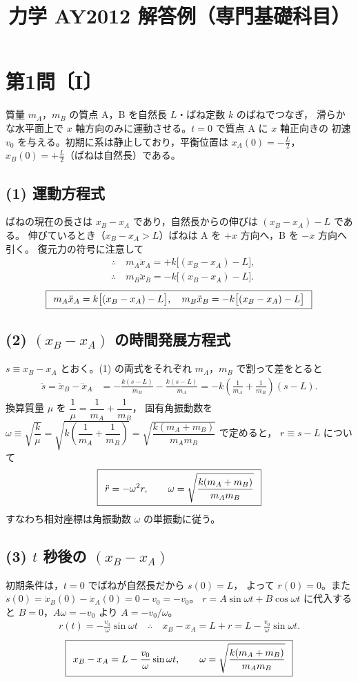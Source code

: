 \documentclass[11pt,a4paper]{article}
\title{力学 AY2012 解答例（専門基礎科目）}
\author{}
\date{}
\begin{document}
\maketitle

\section*{第1問〔I〕}

質量 $m_A$，$m_B$ の質点 A，B を自然長 $L$・ばね定数 $k$ のばねでつなぎ，
滑らかな水平面上で $x$ 軸方向のみに運動させる。$t=0$ で質点 A に $x$ 軸正向きの
初速 $v_0$ を与える。初期に系は静止しており，平衡位置は
$x_A(0)=-\tfrac{L}{2}$，$x_B(0)=+\tfrac{L}{2}$（ばねは自然長）である。

\subsection*{(1) 運動方程式}
ばねの現在の長さは $x_B-x_A$ であり，自然長からの伸びは $(x_B-x_A)-L$ である。
伸びているとき（$x_B-x_A>L$）ばねは A を $+x$ 方向へ，B を $-x$ 方向へ引く。
復元力の符号に注意して
\begin{align*}
  &\therefore\quad m_A\ddot{x}_A = +k\bigl[(x_B-x_A)-L\bigr],\\
  &\therefore\quad m_B\ddot{x}_B = -k\bigl[(x_B-x_A)-L\bigr].
\end{align*}
\[
  \boxed{\,\;
    m_A\ddot{x}_A = k\bigl[(x_B-x_A)-L\bigr],\quad
    m_B\ddot{x}_B = -k\bigl[(x_B-x_A)-L\bigr]\;\,}
\]

\subsection*{(2) $(x_B-x_A)$ の時間発展方程式}
$s\equiv x_B-x_A$ とおく。(1) の両式をそれぞれ $m_A$，$m_B$ で割って差をとると
\begin{align*}
  \ddot{s}=\ddot{x}_B-\ddot{x}_A
  &= -\frac{k(s-L)}{m_B}-\frac{k(s-L)}{m_A}
   = -k\!\left(\frac{1}{m_A}+\frac{1}{m_B}\right)(s-L).
\end{align*}
換算質量 $\mu$ を $\dfrac{1}{\mu}=\dfrac{1}{m_A}+\dfrac{1}{m_B}$，
固有角振動数を $\omega\equiv\sqrt{\dfrac{k}{\mu}}
=\sqrt{k\!\left(\dfrac{1}{m_A}+\dfrac{1}{m_B}\right)}
=\sqrt{\dfrac{k(m_A+m_B)}{m_A m_B}}$ で定めると，
$r\equiv s-L$ について
\[
  \boxed{\,\;\ddot{r}=-\omega^2 r,\qquad
  \omega=\sqrt{\dfrac{k(m_A+m_B)}{m_A m_B}}\;\,}
\]
すなわち相対座標は角振動数 $\omega$ の単振動に従う。

\subsection*{(3) $t$ 秒後の $(x_B-x_A)$}
初期条件は，$t=0$ でばねが自然長だから $s(0)=L$，
よって $r(0)=0$。また $\dot{s}(0)=\dot{x}_B(0)-\dot{x}_A(0)=0-v_0=-v_0$。
$r=A\sin\omega t+B\cos\omega t$ に代入すると $B=0$，$A\omega=-v_0$ より $A=-v_0/\omega$。
\begin{align*}
  r(t)=-\frac{v_0}{\omega}\sin\omega t
  \quad\therefore\quad
  x_B-x_A = L+r = L-\frac{v_0}{\omega}\sin\omega t.
\end{align*}
\[
  \boxed{\,\;x_B-x_A = L-\dfrac{v_0}{\omega}\sin\omega t,\qquad
  \omega=\sqrt{\dfrac{k(m_A+m_B)}{m_A m_B}}\;\,}
\]
\end{document}
